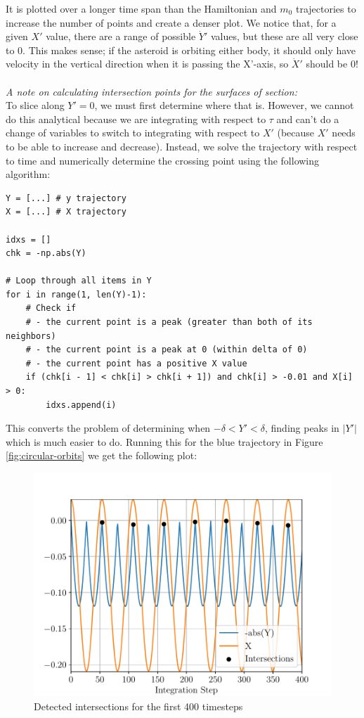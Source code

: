 \documentclass[11pt]{article}
\begin{document}
It is plotted over a longer time span than the Hamiltonian and $m_0$ trajectories to increase the number of points and create a denser plot. We notice that, for a given $X'$ value, there are a range of possible $\dot Y'$ values, but these are all very close to 0. This makes sense; if the asteroid is orbiting either body, it should only have velocity in the vertical direction when it is passing the X'-axis, so $\dot X'$ should be 0! 
\\
\\
\noindent
\textit{A note on calculating intersection points for the surfaces of section:} \\
To slice along $Y'=0$, we must first determine where that is. However, we cannot do this analytical because we are integrating with respect to $\tau$ and can't do a change of variables to switch to integrating with respect to $X'$ (because $X'$ needs to be able to increase and decrease). Instead, we solve the trajectory with respect to time and numerically determine the crossing point using the following algorithm:
\begin{verbatim}
Y = [...] # y trajectory
X = [...] # X trajectory

idxs = []
chk = -np.abs(Y)

# Loop through all items in Y
for i in range(1, len(Y)-1):
    # Check if
    # - the current point is a peak (greater than both of its neighbors)
    # - the current point is a peak at 0 (within delta of 0)
    # - the current point has a positive X value
    if (chk[i - 1] < chk[i] > chk[i + 1]) and chk[i] > -0.01 and X[i] > 0:
        idxs.append(i)
\end{verbatim}
This converts the problem of determining when $-\delta <Y' < \delta$, finding peaks in $|Y'|$ which is much easier to do. Running this for the blue trajectory in Figure \ref{fig:circular-orbits} we get the following plot:
\begin{figure}[H]
    \centering
    \includegraphics[width=0.7\linewidth]{figures/intersection_calculation.pdf}
    \caption{Detected intersections for the first 400 timesteps}
    \label{fig:intersection-calculation}
\end{figure}
\end{document}

